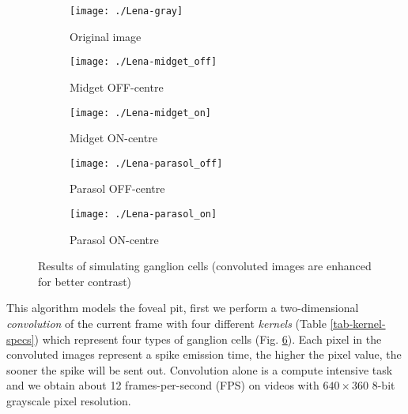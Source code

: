 \begin{figure}[hbt]
  \centering
  \begin{subfigure}[t]{0.15\textwidth}
    \centering
    \captionsetup{justification=centering,margin=0.1cm}
    \texttt{[image: ./Lena-gray]}
    \caption{Original image}
    \label{pic-lena}
  \end{subfigure}
  \begin{subfigure}[t]{0.15\textwidth}
    \centering
    \captionsetup{justification=centering,margin=0.1cm}
    \texttt{[image: ./Lena-midget\_off]}
    \caption{Midget OFF-centre}
    \label{pic-lena-M-OFF}
  \end{subfigure}
  \begin{subfigure}[t]{0.15\textwidth}
    \centering
    \captionsetup{justification=centering,margin=0.1cm}
    \texttt{[image: ./Lena-midget\_on]}
    \caption{Midget ON-centre}
    \label{pic-lena-M-ON}
  \end{subfigure}
  \begin{subfigure}[t]{0.15\textwidth}
    \centering
    \captionsetup{justification=centering,margin=0.1cm}
    \texttt{[image: ./Lena-parasol\_off]}
    \caption{Parasol OFF-centre}
    \label{pic-lena-P-OFF}
  \end{subfigure}
  \begin{subfigure}[t]{0.15\textwidth}
    \centering
    \captionsetup{justification=centering,margin=0.1cm}
    \texttt{[image: ./Lena-parasol\_on]}
    \caption{Parasol ON-centre}
    \label{pic-lena-P-ON}
  \end{subfigure}
  \caption{Results of simulating ganglion cells (convoluted images are enhanced for better contrast)}
  \label{fig-convolution-results}
\end{figure}
This algorithm models the foveal pit, first we perform a two-dimensional  
\emph{convolution} of the current frame with four different \emph{kernels} (Table \ref{tab-kernel-specs})
which represent four types of ganglion cells (Fig. 
\ref{fig-convolution-results}). Each pixel in the convoluted images represent a 
spike emission time, the higher the pixel value, the sooner the spike will be 
sent out. Convolution alone is a compute intensive task and we obtain about 12
frames-per-second (FPS) on videos with $640\times360$ 8-bit grayscale pixel 
resolution. 

